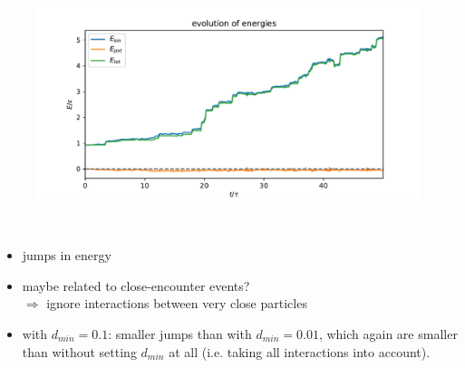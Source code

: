     \begin{figure}[h!]
        \centering
        \includegraphics[width=\textwidth]{../figures/energy.pdf}
    \end{figure} \ \\ 
    \begin{itemize}
        \item jumps in energy
        \item maybe related to close-encounter events? \\
            $\Rightarrow$ ignore interactions between very close particles
        \item with $d_{min}=0.1$: smaller jumps than with $d_{min}=0.01$,
            which again are smaller than without setting $d_{min}$ at all 
            (i.e. taking all interactions into account).
    \end{itemize}
    

